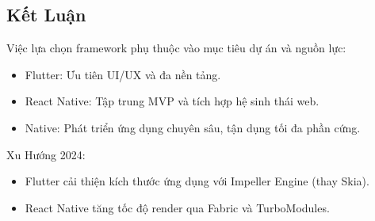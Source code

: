 \subsection{Kết Luận}
\renewcommand{\labelitemi}{--}    
\begin{flushleft}
  \hspace*{0.8cm}Việc lựa chọn framework phụ thuộc vào mục tiêu dự án và nguồn lực:
  \setlength{\leftmargini}{1.5cm}
  \begin{itemize}
      \item Flutter: Ưu tiên UI/UX và đa nền tảng.
      \item React Native: Tập trung MVP và tích hợp hệ sinh thái web.
      \item Native: Phát triển ứng dụng chuyên sâu, tận dụng tối đa phần cứng.
  \end{itemize}
\end{flushleft}

\begin{flushleft}
  \hspace*{0.8cm}Xu Hướng 2024:
  \setlength{\leftmargini}{1.5cm}
  \begin{itemize}
      \item Flutter cải thiện kích thước ứng dụng với Impeller Engine (thay Skia).
      \item React Native tăng tốc độ render qua Fabric và TurboModules.
  \end{itemize}
\end{flushleft}